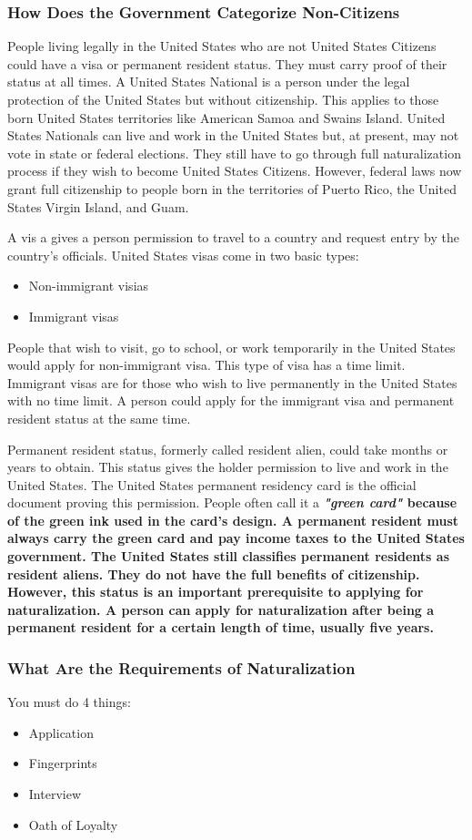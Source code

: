 \subsubsection*{How Does the Government Categorize Non-Citizens}

People living legally in the United States who are not United States Citizens
could have a visa or permanent resident status. They must carry proof of their
status at all times. A United States National is a person under the legal
protection of the United States but without citizenship. This applies to those
born United States territories like American Samoa and Swains Island. United
States Nationals can live and work in the United States but, at present, may
not vote in state or federal elections. They still have to go through full
naturalization process if they wish to become United States Citizens. However,
federal laws now grant full citizenship to people born in the territories of
Puerto Rico, the United States Virgin Island, and Guam.

A vis a gives a person permission to travel to a country and request entry by the country's officials. United States visas come in two basic types:

\begin{itemize}
  \item Non-immigrant visias
  \item Immigrant visas
\end{itemize}

People that wish to visit, go to school, or work temporarily in the United
States would apply for non-immigrant visa. This type of visa has a time limit.
Immigrant visas are for those who wish to live permanently in the United States
with no time limit. A person could apply for the immigrant visa and permanent
resident status at the same time.

Permanent resident status, formerly called resident alien, could take months or
years to obtain. This status gives the holder permission to live and work in
the United States. The United States permanent residency card is the official
document proving this permission. People often call it a \bf{\it{"green
card"}} because of the green ink used in the card's design. A permanent
resident must always carry the green card and pay income taxes to the United
States government. The United States still classifies permanent residents as
resident aliens. They do not have the full benefits of citizenship. However,
this status is an important prerequisite to applying for naturalization. A
person can apply for naturalization after being a permanent resident for a
certain length of time, usually five years.

\subsubsection*{What Are the Requirements of Naturalization}

You must do 4 things:

\begin{itemize}
  \item Application
  \item Fingerprints
  \item Interview
  \item Oath of Loyalty
\end{itemize}

\newpage
